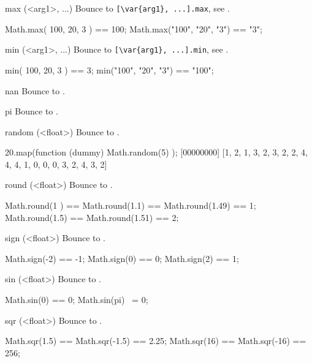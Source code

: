 \begin{urbiscriptapi}
\item[max](<arg1>, ...)%
  Bounce to \lstinline|[\var{arg1}, ...].max|, see .
\begin{urbiassert}
Math.max( 100,   20,   3 ) == 100;
Math.max("100", "20", "3") == "3";
\end{urbiassert}

\item[min](<arg1>, ...)%
  Bounce to \lstinline|[\var{arg1}, ...].min|, see .
\begin{urbiassert}
min( 100,   20,   3 ) ==     3;
min("100", "20", "3") == "100";
\end{urbiassert}

\item[nan]
  Bounce to .

\item[pi]
  Bounce to .

\item[random](<float>)%
  Bounce to .
\begin{urbiscript}
20.map(function (dummy) { Math.random(5) });
[00000000] [1, 2, 1, 3, 2, 3, 2, 2, 4, 4, 4, 1, 0, 0, 0, 3, 2, 4, 3, 2]
\end{urbiscript}

\item[round](<float>)%
  Bounce to .
\begin{urbiassert}
Math.round(1  ) == Math.round(1.1)  == Math.round(1.49) == 1;
Math.round(1.5) == Math.round(1.51) == 2;
\end{urbiassert}

\item[sign](<float>)%
  Bounce to .
\begin{urbiassert}
Math.sign(-2) == -1;  Math.sign(0)  == 0;  Math.sign(2)  == 1;
\end{urbiassert}

\item[sin](<float>)%
  Bounce to .
\begin{urbiassert}
Math.sin(0) == 0;
Math.sin(pi) ~= 0;
\end{urbiassert}

\item[sqr](<float>)%
  Bounce to .
\begin{urbiassert}
Math.sqr(1.5) == Math.sqr(-1.5) == 2.25;
Math.sqr(16)  == Math.sqr(-16)  == 256;
\end{urbiassert}


\end{urbiscriptapi}
